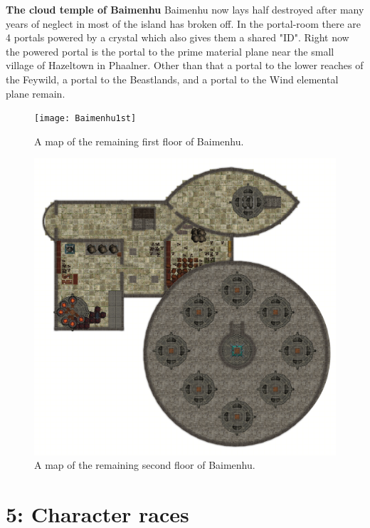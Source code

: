 \documentclass[a4paper]{article}
\begin{document}
\textbf{The cloud temple of Baimenhu}
Baimenhu now lays half destroyed after many years of neglect in most of the island has broken off. In the portal-room there are 4 portals powered by a crystal which also gives them a shared "ID". Right now the powered portal is the portal to the prime material plane near the small village of Hazeltown in Phaalner. Other than that a portal to the lower reaches of the Feywild, a portal to the Beastlands, and a portal to the Wind elemental plane remain.

\begin{figure}[h]
\begin{center}
\texttt{[image: Baimenhu1st]}
\caption{A map of the remaining first floor of Baimenhu.}\label{Baimenhu1st}
\end{center}
\end{figure}

\begin{figure}[h]
\begin{center}
\includegraphics[scale=0.2]{Baimenhu2nd}
\caption{A map of the remaining second floor of Baimenhu.}\label{Baimenhu2nd}
\end{center}
\end{figure}
\section{5: Character races}
\end{document}
